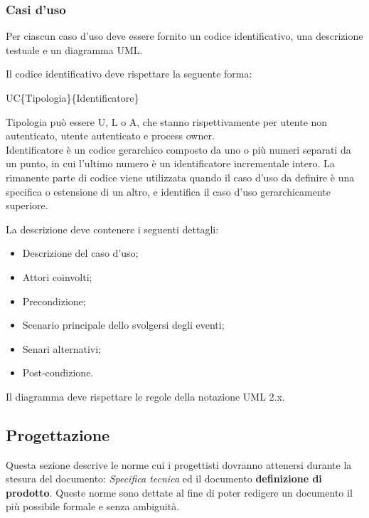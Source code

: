 \subsubsection{Casi d'uso}
Per ciascun caso d'uso deve essere fornito un codice identificativo, una descrizione testuale e un diagramma UML.

\begin{flushleft}
Il codice identificativo deve rispettare la seguente forma:
\end{flushleft}

\begin{center}UC\{Tipologia\}\{Identificatore\}\end{center}
Tipologia può essere U, L o A, che stanno rispettivamente per utente non autenticato, utente autenticato e process owner.\\
Identificatore è un codice gerarchico composto da uno o più numeri separati da un punto, in cui l'ultimo numero è un identificatore incrementale intero.
La rimanente parte di codice viene utilizzata quando il caso d'uso da definire è una specifica o estensione di un altro, e identifica il caso d'uso gerarchicamente superiore.

\begin{flushleft}
La descrizione deve contenere i seguenti dettagli:
\end{flushleft}

\begin{itemize}
\item Descrizione del caso d'uso;
\item Attori coinvolti;
\item Precondizione;
\item Scenario principale dello svolgersi degli eventi;
\item Senari alternativi;
\item Post-condizione.
\end{itemize}

\begin{flushleft}
Il diagramma deve rispettare le regole della notazione UML 2.x.
\end{flushleft}

\subsection{Progettazione}
Questa sezione descrive le norme cui i progettisti dovranno attenersi durante la stesura del documento:  \textit{Specifica tecnica} ed il documento \textbf{definizione di prodotto}. Queste norme sono dettate al fine di poter redigere un documento il più possibile formale e senza ambiguità.

